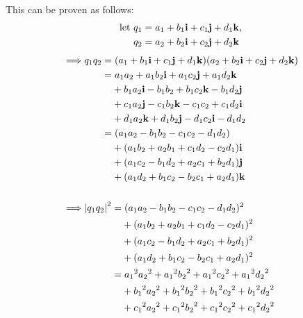 \documentclass[12pt]{article}
\theoremstyle{definition}
\begin{document}
This can be proven as follows:
\begin{equation}
    \begin{aligned}
        \text{let } & q_1 = a_1 + b_1\vb{i} + c_1\vb{j} + d_1\vb{k}, \\
        & q_2 = a_2 + b_2\vb{i} + c_2\vb{j} + d_2\vb{k} \\
    \end{aligned}
\end{equation}
\begin{alignat}{2}
    \implies & q_1q_2 = (a_1 + b_1\vb{i} + c_1\vb{j} + d_1\vb{k})(a_2 + b_2\vb{i} + c_2\vb{j} + d_2\vb{k}) \\
             & \phantom{q_1q_2} = a_1a_2 + a_1b_2\vb{i} + a_1c_2\vb{j} + a_1d_2\vb{k} \\
             & \phantom{q_1q_2=} + b_1a_2\vb{i} - b_1b_2 + b_1c_2\vb{k} - b_1d_2\vb{j} \nonumber \\
             & \phantom{q_1q_2=} + c_1a_2\vb{j} - c_1b_2\vb{k} - c_1c_2 + c_1d_2\vb{i} \nonumber \\
             & \phantom{q_1q_2=} + d_1a_2\vb{k} + d_1b_2\vb{j} - d_1c_2\vb{i} - d_1d_2 \nonumber \\
             & \phantom{q_1q_2} = (a_1a_2 - b_1b_2 - c_1c_2 - d_1d_2) \\
             & \phantom{q_1q_2=} + (a_1b_2 + a_2b_1 + c_1d_2 - c_2d_1)\vb{i} \nonumber \\
             & \phantom{q_1q_2=} + (a_1c_2 - b_1d_2 + a_2c_1 + b_2d_1)\vb{j} \nonumber \\
             & \phantom{q_1q_2=} + (a_1d_2 + b_1c_2 - b_2c_1 + a_2d_1)\vb{k} \nonumber \\[15pt]
    \implies & \abs{q_1q_2}^2 = (a_1a_2 - b_1b_2 - c_1c_2 - d_1d_2)^2 \\
             & \phantom{\abs{q_1q_2}^2=} + (a_1b_2 + a_2b_1 + c_1d_2 - c_2d_1)^2 \nonumber \\
             & \phantom{\abs{q_1q_2}^2=} + (a_1c_2 - b_1d_2 + a_2c_1 + b_2d_1)^2 \nonumber \\
             & \phantom{\abs{q_1q_2}^2=} + (a_1d_2 + b_1c_2 - b_2c_1 + a_2d_1)^2 \nonumber \\
             & \phantom{\abs{q_1q_2}^2} = {a_1}^2{a_2}^2 + {a_1}^2{b_2}^2 + {a_1}^2{c_2}^2 + {a_1}^2{d_2}^2 \label{eqnq1q2-1} \\
             & \phantom{\abs{q_1q_2}^2=} + {b_1}^2{a_2}^2 + {b_1}^2{b_2}^2 + {b_1}^2{c_2}^2 + {b_1}^2{d_2}^2 \nonumber \\
             & \phantom{\abs{q_1q_2}^2=} + {c_1}^2{a_2}^2 + {c_1}^2{b_2}^2 + {c_1}^2{c_2}^2 + {c_1}^2{d_2}^2 \nonumber \\

\end{alignat}
\end{document}
